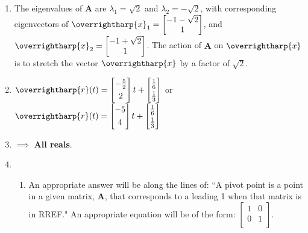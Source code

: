 \documentclass[fleqn]{article}[11pt]
\begin{document}
\begin{enumerate}
	\item The eigenvalues of $\mathbf{A}$ are $\lambda_1=\sqrt{2}$ and $\lambda_2=-\sqrt{2}$, with corresponding eigenvectors of $\overrightharp{x}_1=\begin{bmatrix} 
								-1-\sqrt{2} \\
								1 \\
							\end{bmatrix}$,
 and $\overrightharp{x}_2=\begin{bmatrix} 
								-1+\sqrt{2} \\
								1 \\
							\end{bmatrix}$. The action of $\mathbf{A}$ on $\overrightharp{x}$ is to stretch the vector $\overrightharp{x}$ by a factor of $\sqrt{2}$.

	
	\item \(\overrightharp{r}(t)=\begin{bmatrix}
							-\frac{5}{2} \\[3pt]
							2 \\
						 \end{bmatrix}t+
						 \begin{bmatrix}
							\frac{1}{6} \\[3pt]
							\frac{1}{3} \\
						 \end{bmatrix}\) or 
		\(\overrightharp{r}(t)=\begin{bmatrix}
							-5 \\[3pt]
							4 \\
						 \end{bmatrix}t+
						 \begin{bmatrix}
							\frac{1}{6} \\[3pt]
							\frac{1}{3} \\
						 \end{bmatrix}\)
	
	\item $\implies$ \textbf{All reals}.
	
	\item 
		\begin{enumerate}[label=\alph*.]
			\item An appropriate answer will be along the lines of: ``A pivot point is a point in a given matrix, $\mathbf{A}$, that corresponds to a leading 1 when that matrix is in RREF." An appropriate equation will be of the form: \(\begin{bmatrix}
		 	1 & 0 \\
			0 & 1 \\
		 \end{bmatrix}\).
			

\end{enumerate}
\end{enumerate}
\end{document}
